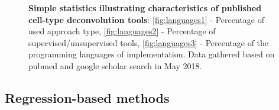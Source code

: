 \documentclass[12pt,]{book}
\theoremstyle{definition}
\theoremstyle{definition}
\theoremstyle{definition}
\theoremstyle{remark}
\begin{document}
\begin{figure}
\caption[Simple statistics illustrating characteristics of published cell-type deconvolution tools]{\textbf{Simple statistics illustrating
characteristics of published cell-type deconvolution tools}:
\ref{fig:languages1} - Percentage of used approach type,
\ref{fig:languages2} - Percentage of supervised/unsupervised tools,
\ref{fig:languages3} - Percentage of the programming languages of
implementation. Data gathered based on pubmed and google scholar search
in May 2018.}\label{fig:languages}
\end{figure}









\hypertarget{regression-based-methods}{%
\subsection{Regression-based methods}\label{regression-based-methods}}
\end{document}
